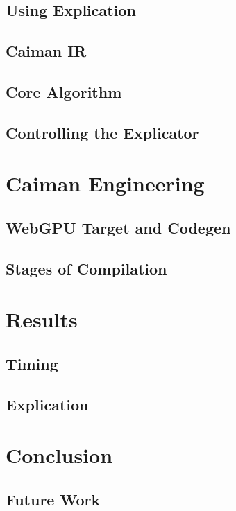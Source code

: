 \subsection{Using Explication}

\subsection{Caiman IR}

\subsection{Core Algorithm}

\subsection{Controlling the Explicator}

\section{Caiman Engineering}
\label{sec:engineering}

\subsection{WebGPU Target and Codegen}

\subsection{Stages of Compilation}

\section{Results}
\label{sec:results}

\subsection{Timing}

\subsection{Explication}

\section{Conclusion}
\label{sec:conclusion}

\subsection{Future Work}
\label{subsec:future}